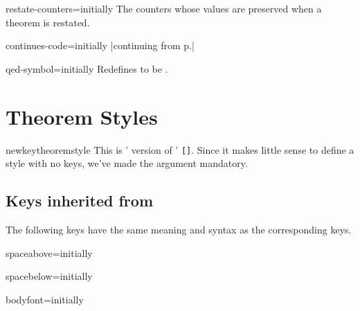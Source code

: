 \documentclass{ltxdoc}
\newcommand{\bracks}[1]{\texttt{[#1]}}
\newcommand{\ttbraces}[1]{\braces{\texttt{#1}}}
\begin{document}
\begin{docKey}{restate-counters}{=}{initially \ttbraces{equation}}
The counters whose values are preserved when a theorem is restated.
\end{docKey}

\begin{docKey}{continues-code}{=}{initially |continuing from p.\cs{,}\ttbraces{\#1}|}

\end{docKey}

\begin{docKey}{qed-symbol}{=}{initially }
Redefines  to be .
\end{docKey}

\section{Theorem Styles}

\begin{docCommand}{newkeytheoremstyle}{}
This is ' version of ' \bracks{}. Since it makes little sense to define a style with no keys, we've made the  argument mandatory.
\end{docCommand}

\subsection{Keys inherited from }

The following keys have the same meaning and syntax as the corresponding  keys.

\begin{docKey}{spaceabove}{=}{initially }

\end{docKey}

\begin{docKey}{spacebelow}{=}{initially }

\end{docKey}

\begin{docKey}{bodyfont}{=}{initially }

\end{docKey}
\end{document}
